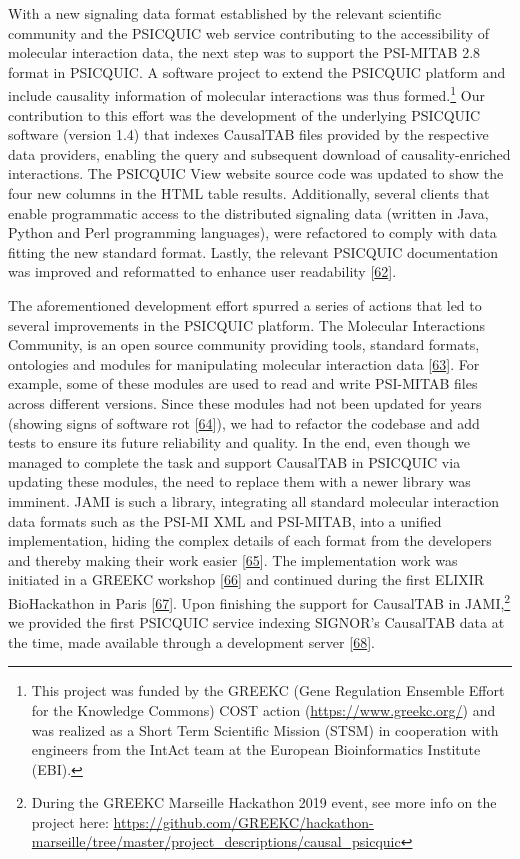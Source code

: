 \documentclass[
  12pt,
]{book}
\begin{document}
With a new signaling data format established by the relevant scientific community and the PSICQUIC web service contributing to the accessibility of molecular interaction data, the next step was to support the PSI-MITAB 2.8 format in PSICQUIC.
A software project to extend the PSICQUIC platform and include causality information of molecular interactions was thus formed.\footnote{This project was funded by the GREEKC (Gene Regulation Ensemble Effort for the Knowledge Commons) COST action (\url{https://www.greekc.org/}) and was realized as a Short Term Scientific Mission (STSM) in cooperation with engineers from the IntAct team at the European Bioinformatics Institute (EBI).}
Our contribution to this effort was the development of the underlying PSICQUIC software (version 1.4) that indexes CausalTAB files provided by the respective data providers, enabling the query and subsequent download of causality-enriched interactions.
The PSICQUIC View website source code was updated to show the four new columns in the HTML table results.
Additionally, several clients that enable programmatic access to the distributed signaling data (written in Java, Python and Perl programming languages), were refactored to comply with data fitting the new standard format.
Lastly, the relevant PSICQUIC documentation was improved and reformatted to enhance user readability {[}\protect\hyperlink{ref-mitab28-doc}{62}{]}.

The aforementioned development effort spurred a series of actions that led to several improvements in the PSICQUIC platform.
The Molecular Interactions Community, is an open source community providing tools, standard formats, ontologies and modules for manipulating molecular interaction data {[}\protect\hyperlink{ref-mi-github}{63}{]}.
For example, some of these modules are used to read and write PSI-MITAB files across different versions.
Since these modules had not been updated for years (showing signs of software rot {[}\protect\hyperlink{ref-soft-rot-wiki}{64}{]}), we had to refactor the codebase and add tests to ensure its future reliability and quality.
In the end, even though we managed to complete the task and support CausalTAB in PSICQUIC via updating these modules, the need to replace them with a newer library was imminent.
JAMI is such a library, integrating all standard molecular interaction data formats such as the PSI-MI XML and PSI-MITAB, into a unified implementation, hiding the complex details of each format from the developers and thereby making their work easier {[}\protect\hyperlink{ref-Sivade2018a}{65}{]}.
The implementation work was initiated in a GREEKC workshop {[}\protect\hyperlink{ref-Hinxton2018}{66}{]} and continued during the first ELIXIR BioHackathon in Paris {[}\protect\hyperlink{ref-biohack2018}{67}{]}.
Upon finishing the support for CausalTAB in JAMI,\footnote{During the GREEKC Marseille Hackathon 2019 event, see more info on the project here: \url{https://github.com/GREEKC/hackathon-marseille/tree/master/project_descriptions/causal_psicquic}} we provided the first PSICQUIC service indexing SIGNOR's CausalTAB data at the time, made available through a development server {[}\protect\hyperlink{ref-psicquic-causalTAB-dataset}{68}{]}.
\end{document}
